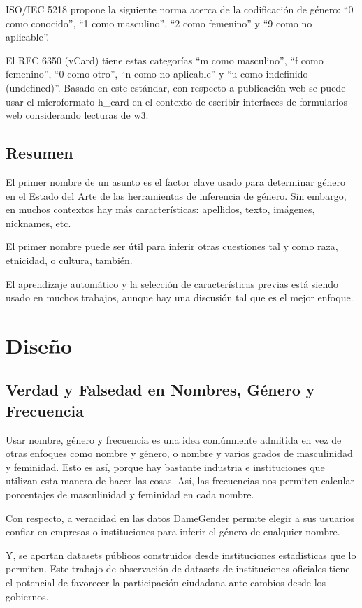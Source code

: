 \documentclass[a4paper]{article}
\begin{document}
ISO/IEC 5218 propone la siguiente norma acerca de la codificación
de género: ``0 como conocido'', ``1 como masculino'', ``2 como femenino''
y ``9 como no aplicable''.

El RFC 6350 (vCard) tiene estas categorías ``m como masculino'',
``f como femenino'', ``0 como otro'', ``n como no aplicable'' y
``u como indefinido (undefined)''. Basado en este estándar, con
respecto a publicación web se puede usar el microformato h\_card
en el contexto de escribir interfaces de formularios web considerando
lecturas de w3.

\subsection{Resumen}

El primer nombre de un asunto es el factor clave usado para
determinar género en el Estado del Arte de las herramientas de
inferencia de género. Sin embargo, en muchos contextos hay más
características: apellidos, texto, imágenes, nicknames, etc.

El primer nombre puede ser útil para inferir otras cuestiones
tal y como raza, etnicidad, o cultura, también.

El aprendizaje automático y la selección de características
previas está siendo usado en muchos trabajos, aunque hay una
discusión tal que es el mejor enfoque.

\section{Diseño}

\subsection{Verdad y Falsedad en Nombres, Género y Frecuencia}

Usar nombre, género y frecuencia es una idea comúnmente admitida
en vez de otras enfoques como nombre y género, o nombre y varios
grados de masculinidad y feminidad. Esto es así, porque hay bastante
industria e instituciones que utilizan esta manera de hacer las cosas.
Así, las frecuencias nos permiten calcular porcentajes de masculinidad
y feminidad en cada nombre.

Con respecto, a veracidad en las datos DameGender permite elegir
a sus usuarios confiar en empresas o instituciones para inferir el
género de cualquier nombre.

Y, se aportan datasets públicos construidos desde instituciones
estadísticas que lo permiten. Este trabajo de observación de
datasets de instituciones oficiales tiene el potencial de favorecer
la participación ciudadana ante cambios desde los gobiernos.
\end{document}
